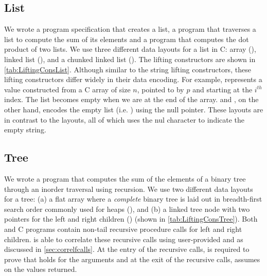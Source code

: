 

\subsection{List}
\label{sec:explist}
We wrote a \SpecL{} program specification that creates a list, a
program that traverses a list to compute the sum of its elements and a program
that computes the dot product of two lists. We use three different
data layouts for a list in C: array (),
linked list (), and
a chunked linked list ().
The lifting constructors are shown in \cref{tab:LiftingConsList}.
Although similar to the string lifting constructors, these lifting
constructors differ widely in their data encoding. For example,
 represents a  value constructed
from a C array of size $n$, pointed to by $p$ and starting at the $i^{th}$ index.
The list becomes empty when we are at the end of the array.
 and , on the other hand, encodes the
empty list (i.e. ) using the null pointer.
These layouts are in contrast to the  layouts, all of which uses the nul character
to indicate the empty string.



\subsection{Tree}
\label{sec:exptree}
We wrote a \SpecL{} program that computes the sum of the elements of a binary tree
through an inorder traversal using recursion. We use two different data layouts for a tree: 
(a) a flat array where a
{\em complete} binary tree is laid out in breadth-first search order commonly used for heaps (),
and (b) a linked tree node with two pointers for the left and right children () (shown in \cref{tab:LiftingConsTree}).
Both \SpecL{} and C programs contain non-tail recursive procedure calls for left and right children.
\toolName{} is able to correlate these recursive calls using user-provided \pre{} and \post{} as discussed in \cref{sec:correlfcalls}.
At the entry of the recursive calls, \toolName{} is required to prove that \pre{} holds for the arguments
and at the exit of the recursive calls, \toolName{} assumes \post{} on the values returned.

